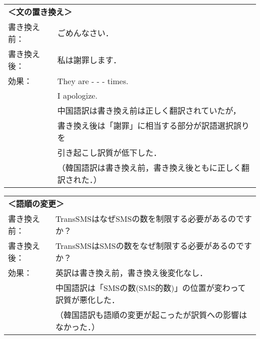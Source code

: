 \begin{tabular}{ll}
\multicolumn{2}{l}{\bf ＜文の置き換え＞}   \\
書き換え前： & ごめんなさい． \\
書き換え後： & 私は謝罪します．\\
効果： & They are - - - times. \\ 
       & I apologize. \\
       & 中国語訳は書き換え前は正しく翻訳されていたが， \\
       & 書き換え後は「謝罪」に相当する部分が訳語選択誤りを \\
       & 引き起こし訳質が低下した．\\
       & （韓国語訳は書き換え前，書き換え後ともに正しく翻訳された．） \\
\end{tabular}

\begin{tabular}{ll}
\multicolumn{2}{l}{\bf ＜語順の変更＞}   \\
書き換え前： & TransSMSはなぜSMSの数を制限する必要があるのですか？ \\
書き換え後： & TransSMSはSMSの数をなぜ制限する必要があるのですか？ \\
効果： & 英訳は書き換え前，書き換え後変化なし． \\ 
       & 中国語訳は「SMSの数(SMS的数)」の位置が変わって訳質が悪化した． \\
       & （韓国語訳も語順の変更が起こったが訳質への影響はなかった．） \\
\end{tabular}


